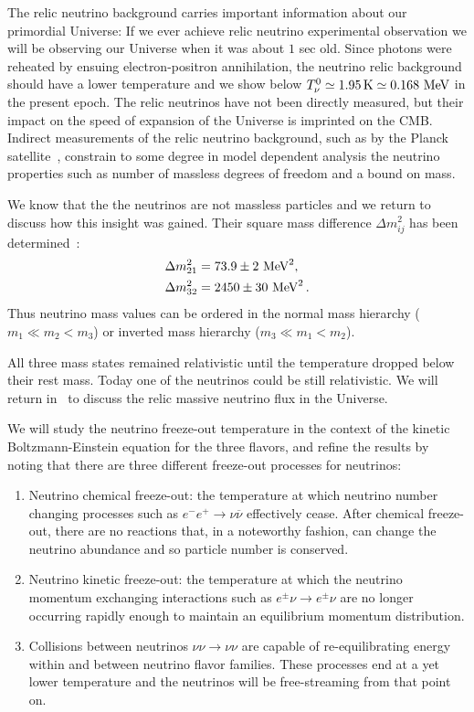 The relic neutrino background carries important information about our primordial Universe: If we ever achieve relic neutrino experimental observation we will be observing our Universe when it was about $1$ sec old. Since photons were reheated by ensuing electron-positron annihilation, the neutrino relic background should have a lower temperature and we show below $T_\nu^0\simeq 1.95\,\mathrm{K}\simeq 0.168\text{ MeV}$ in the present epoch.
The relic neutrinos have not been directly measured, but their impact on the speed of expansion of the Universe is imprinted on the CMB. Indirect measurements of the relic neutrino background, such as by the Planck satellite~\cite{Planck:2018vyg,Planck:2015fie,Planck:2013pxb}, constrain to some degree in model dependent analysis the neutrino properties such as number of massless degrees of freedom and a bound on mass.

We know that the the neutrinos are not massless particles and we return to discuss how this insight was gained. Their square mass difference $\Delta m^2_{ij}$ has been determined~\cite{ParticleDataGroup:2022pth}:
\begin{align}
&\Delta{m}_{21}^2=73.9\pm 2\text{ MeV} ^2,\\
&\Delta{m}_{32}^2=2450\pm 30\text{ MeV} ^2\,.
\end{align}
Thus neutrino mass values can be ordered in the normal mass hierarchy ($m_1\ll m_2<m_3$) or inverted mass hierarchy ($m_3\ll m_1<m_2$). 

All three mass states remained relativistic until the temperature dropped below their rest mass. Today one of the neutrinos could be still relativistic. We will return in~ to discuss the relic massive neutrino flux in the Universe.
 
We will study the neutrino freeze-out temperature in the context of the kinetic Boltzmann-Einstein equation for the three flavors, and refine the results by noting that there are three different freeze-out processes for neutrinos:
\begin{enumerate}
\item Neutrino chemical freeze-out: the temperature at which neutrino number changing processes such as $e^-e^+\to\nu\overline\nu$ effectively cease. After chemical freeze-out, there are no reactions that, in a noteworthy fashion, can change the neutrino abundance and so particle number is conserved.
%
\item Neutrino kinetic freeze-out: the temperature at which the neutrino momentum exchanging interactions such as $e^\pm\nu\to e^\pm\nu$ are no longer occurring rapidly enough to maintain an equilibrium momentum distribution. 
%
\item Collisions between neutrinos $\nu\nu\to\nu\nu$ are capable of re-equilibrating energy within and between neutrino flavor families. These processes end at a yet lower temperature and the neutrinos will be free-streaming from that point on.
\end{enumerate}

